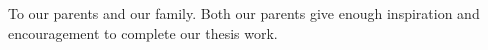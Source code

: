 To our parents and our family. Both our parents give enough inspiration and encouragement to complete our thesis work.